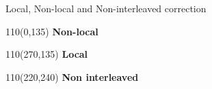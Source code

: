 \documentclass{beamer}
\begin{document}
\begin{frame}{Local, Non-local and Non-interleaved correction}
  \setlength{\TPHorizModule}{1pt}
  \setlength{\TPVertModule}{1pt}
 \begin{textblock}{110}(0,135)
  \textbf{Non-local}
 \end{textblock}
  \begin{textblock}{110}(270,135)
  \textbf{Local}
 \end{textblock}
   \begin{textblock}{110}(220,240)
  \textbf{Non interleaved}
 \end{textblock}
\end{frame}
\end{document}
